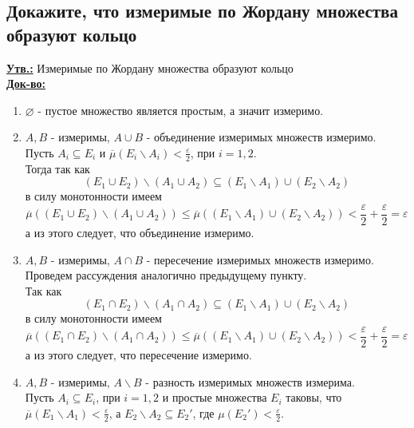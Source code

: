 
\subsection{Докажите, что измеримые по Жордану множества образуют кольцо}

\textbf{\underline{Утв.:} } Измеримые по Жордану множества образуют кольцо\\
\textbf{\underline{Док-во:} } \\
\begin{enumerate}
    \item $\varnothing$ - пустое множество является простым, а значит измеримо.
    \item $A, B$ - измеримы, $A \cup B$ - объединение измеримых множеств измеримо. \\
Пусть $A_i \subseteq E_i$ и $\overline{\mu}(E_i\backslash A_i) < \frac{\varepsilon}{2}$, при $i = 1, 2$. \\
Тогда так как 
\[(E_1\cup E_2) \backslash (A_1\cup A_2) \subseteq (E_1\backslash A_1) \cup (E_2\backslash A_2) \]
в силу монотонности имеем 
\[\overline{\mu}((E_1\cup E_2) \backslash (A_1\cup A_2)) \leq \overline{\mu}((E_1\backslash A_1) \cup (E_2\backslash A_2)) < \frac{\varepsilon}{2} + \frac{\varepsilon}{2} = \varepsilon \]
а из этого следует, что объединение измеримо.
    \item $A, B$ - измеримы, $A \cap B $ - пересечение измеримых множеств измеримо. \\
Проведем рассуждения аналогично предыдущему пункту. \\
Так как
\[(E_1\cap E_2) \backslash (A_1\cap A_2) \subseteq (E_1\backslash A_1) \cup (E_2\backslash A_2) \]
в силу монотонности имеем
\[ \overline{\mu}((E_1\cap E_2) \backslash (A_1\cap A_2)) \leq \overline{\mu}((E_1\backslash A_1) \cup (E_2\backslash A_2)) < \frac{\varepsilon}{2} + \frac{\varepsilon}{2} = \varepsilon \]
а из этого следует, что пересечение измеримо.
    \item $A, B$ - измеримы, $ A \backslash B$ - разность измеримых множеств измерима. \\
Пусть $A_i \subseteq E_i$, при $i = 1, 2$ и простые множества $E_i$ таковы, что $\overline{\mu}(E_1\backslash A_1) < \frac{\varepsilon}{2}$, а $E_2 \backslash A_2 \subseteq E_2'$, где $\mu(E_2') < \frac{\varepsilon}{2}$. \\

\end{enumerate}

